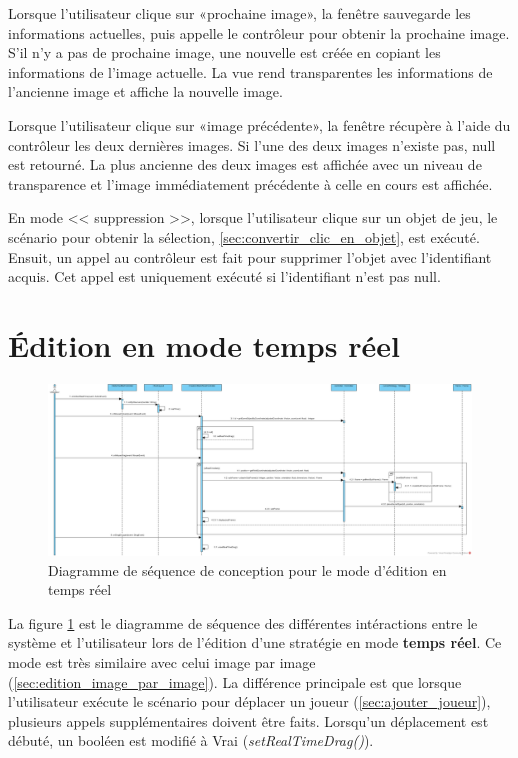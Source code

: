 Lorsque l'utilisateur clique sur «prochaine image», la fenêtre sauvegarde les informations actuelles, puis appelle le contrôleur pour obtenir la prochaine image.
S'il n'y a pas de prochaine image, une nouvelle est créée en copiant les informations de l'image actuelle.
La vue rend transparentes les informations de l'ancienne image et affiche la nouvelle image.

Lorsque l'utilisateur clique sur «image précédente», la fenêtre récupère à l'aide du contrôleur les deux dernières images.
Si l'une des deux images n'existe pas, null est retourné.
La plus ancienne des deux images est affichée avec un niveau de transparence et l'image immédiatement précédente à celle en cours est affichée.

En mode << suppression >>, lorsque l'utilisateur clique sur un objet de jeu, le scénario pour obtenir la sélection, \ref{sec:convertir_clic_en_objet}, est exécuté.
Ensuit, un appel au contrôleur est fait pour supprimer l'objet avec l'identifiant acquis.
Cet appel est uniquement exécuté si l'identifiant n'est pas null.

\section{Édition en mode temps réel}
\label{sec:edition_temps_reel}

\begin{figure}[htpb]
    \centering
    \includegraphics[scale=0.3]{fig/dsc_edition_temps_reel.png}
    \caption{Diagramme de séquence de conception pour le mode d'édition en temps réel}
    \label{fig:dsc_edit_real_time}
\end{figure}

La figure \ref{fig:dsc_edit_real_time} est le diagramme de séquence des différentes intéractions entre le système et l'utilisateur lors de l'édition d'une stratégie en mode \textbf{temps réel}.
Ce mode est très similaire avec celui image par image (\ref{sec:edition_image_par_image}).
La différence principale est que lorsque l'utilisateur exécute le scénario pour déplacer un joueur (\ref{sec:ajouter_joueur}), plusieurs appels supplémentaires doivent être faits.
Lorsqu'un déplacement est débuté, un booléen est modifié à Vrai (\textit{setRealTimeDrag()}).

